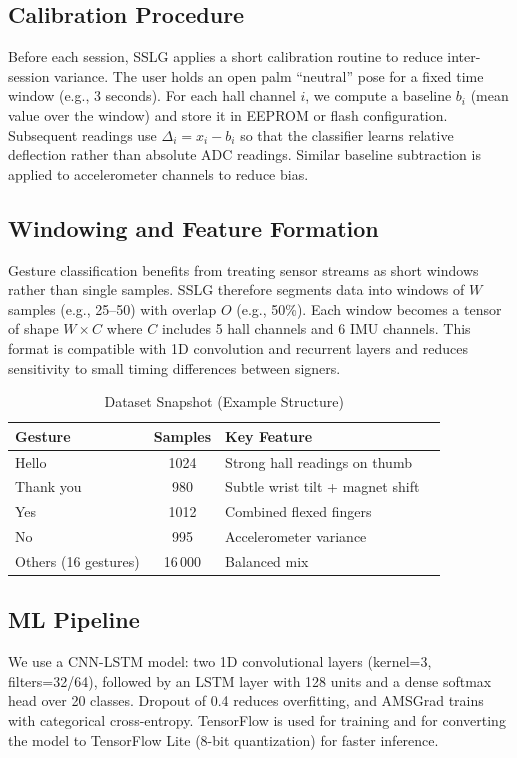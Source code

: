 \documentclass[conference]{IEEEtran}
\begin{document}
\subsection{Calibration Procedure}
Before each session, SSLG applies a short calibration routine to reduce inter-session variance. The user holds an open palm ``neutral'' pose for a fixed time window (e.g., 3 seconds). For each hall channel $i$, we compute a baseline $b_i$ (mean value over the window) and store it in EEPROM or flash configuration. Subsequent readings use $\Delta_i = x_i - b_i$ so that the classifier learns relative deflection rather than absolute ADC readings. Similar baseline subtraction is applied to accelerometer channels to reduce bias.

\subsection{Windowing and Feature Formation}
Gesture classification benefits from treating sensor streams as short windows rather than single samples. SSLG therefore segments data into windows of $W$ samples (e.g., 25--50) with overlap $O$ (e.g., 50\%). Each window becomes a tensor of shape $W \times C$ where $C$ includes 5 hall channels and 6 IMU channels. This format is compatible with 1D convolution and recurrent layers and reduces sensitivity to small timing differences between signers.

\begin{table}[htbp]
    \centering
    \caption{Dataset Snapshot (Example Structure)}
    \label{tab:dataset}
    \begin{tabularx}{\columnwidth}{@{}lclX@{}}
        \toprule
        Gesture & Samples & Key Feature \\
        \midrule
        Hello & 1024 & Strong hall readings on thumb \\
        Thank you & 980 & Subtle wrist tilt + magnet shift \\
        Yes & 1012 & Combined flexed fingers \\
        No & 995 & Accelerometer variance \\
        Others (16 gestures) & 16\,000 & Balanced mix \\
        \bottomrule
    \end{tabularx}
\end{table}

\subsection{ML Pipeline}
We use a CNN-LSTM model: two 1D convolutional layers (kernel=3, filters=32/64), followed by an LSTM layer with 128 units and a dense softmax head over 20 classes. Dropout of 0.4 reduces overfitting, and AMSGrad trains with categorical cross-entropy. TensorFlow is used for training and for converting the model to TensorFlow Lite (8-bit quantization) for faster inference\cite{tensorflow}.
\end{document}

